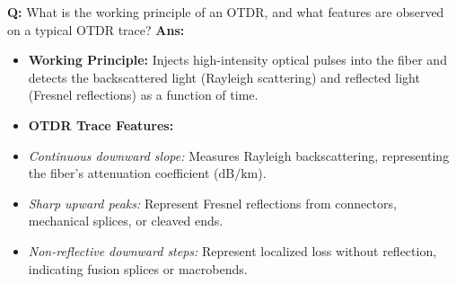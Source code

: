 \documentclass[10pt,a4paper,twocolumn]{article}
\begin{document}
\begin{tcolorbox}[
  colback=white,
  colframe=UnitColorThree,
  colbacktitle=gray!10!white,
  coltitle=black,
  fonttitle=\bfseries\sffamily\small,
  title={Unit III $\bullet$ Card 8: Optical Time Domain Reflectometer (OTDR)},
  boxrule=1.2pt,
  arc=2mm,
  outer arc=2mm,
  boxsep=1.5mm,
  top=1mm,
  bottom=1mm,
  left=1.5mm,
  right=1.5mm,
  before skip=2.5mm,
  after skip=2.5mm
]
\textbf{Q:} What is the working principle of an OTDR, and what features are observed on a typical OTDR trace?
\tcbline
\textbf{Ans:} \begin{itemize}
  \item   \textbf{Working Principle:} Injects high-intensity optical pulses into the fiber and detects the backscattered light (Rayleigh scattering) and reflected light (Fresnel reflections) as a function of time.
  \item   \textbf{OTDR Trace Features:}
  \item   \textit{Continuous downward slope:} Measures Rayleigh backscattering, representing the fiber's attenuation coefficient ($\text{dB/km}$).
  \item   \textit{Sharp upward peaks:} Represent Fresnel reflections from connectors, mechanical splices, or cleaved ends.
  \item   \textit{Non-reflective downward steps:} Represent localized loss without reflection, indicating fusion splices or macrobends.
\end{itemize}
\end{tcolorbox}
\end{document}
